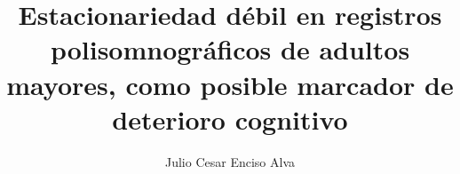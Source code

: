 \documentclass[12pt,letterpaper]{book}
\begin{document}
%
%
%
%
%
%
%
%
%
%
%
%
%

\setcounter{page}{0}
\thispagestyle{empty}

\title{Estacionariedad d\'ebil en registros polisomnogr\'aficos de adultos mayores,
como posible marcador de deterioro cognitivo}
\author{Julio Cesar Enciso Alva}
\end{document}
